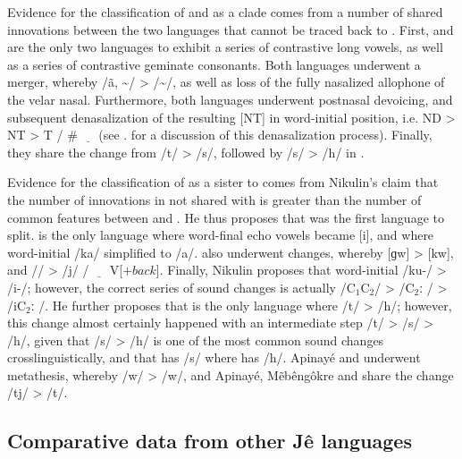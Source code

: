\documentclass[output=paper,hidelinks]{langscibook}
\begin{document}
Evidence for the classification of  and  as a clade comes from a number of shared innovations between the two languages that cannot be traced back to . First,  and  are the only two  languages to exhibit a series of contrastive long vowels, as well as a series of contrastive geminate consonants. Both languages underwent a merger, whereby /\~a, \~\textturnv / > /\~\textturnv /, as well as loss of the fully nasalized allophone of the velar nasal. Furthermore, both languages underwent postnasal devoicing, and subsequent denasalization of the resulting [NT] in word-initial position, i.e. ND > NT > T / \# $\underline{\hspace{1em}}$ (see . for a discussion of this denasalization process). Finally, they share the change from  /t\textesh / > /s/, followed by /s/ > /h/ in  .

Evidence for the classification of  as a sister to  comes from Nikulin's claim that the number of innovations in  not shared with  is greater than the number of common features between  and . He thus proposes that  was the first  language to split.  is the only language where word-final echo vowels became [i], and where word-initial /ka/ simplified to /a/.  also underwent changes, whereby {[}{\NG}ɡ\textfishhookr w{]} > {[}{\NG}kw{]}, and /\textfishhookr / > /j/ / $\underline{\hspace{1em}}$ V{[}$+back${]}. Finally, Nikulin proposes that word-initial /ku-/ > /i-/; however, the correct series of sound changes is actually /C$_{1}$C$_{2}$/ > /C$_{2}$ː / > /iC$_{2}$ː /. He further proposes that  is the only language where  /t\textesh / > /h/; however, this change almost certainly happened with an intermediate step /t\textesh / > /s/ > /h/, given that /s/ > /h/ is one of the most common sound changes crosslinguistically, and that  has /s/ where  has /h/. Apinay\'e and  underwent metathesis, whereby /\textfishhookr w/ > /w\textfishhookr /, and Apinay\'e, M\~eb\^eng\^okre and  share the change /tj/ > /t\textesh /.


\subsection{Comparative data from other Jê languages}
\end{document}
